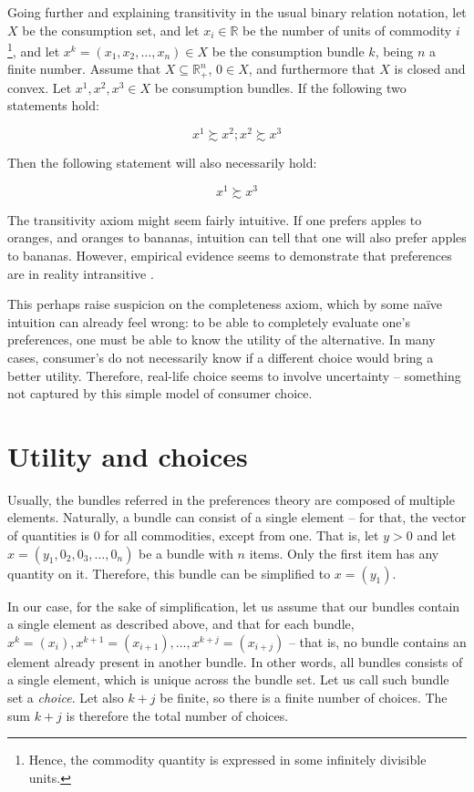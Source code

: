 \documentclass[12pt, letterpaper]{article}
\begin{document}
	Going further and explaining transitivity in the usual binary relation notation, let $X$ be the consumption set, and let $x_i \in \mathbb{R}$ be the number of units of commodity $i$\footnote{Hence, the commodity quantity is expressed in some infinitely divisible units.}, and let $x^k= (x_1, x_2, \dots, x_n) \in X$ be the consumption bundle $k$, being $n$ a finite number. Assume that $X \subseteq \mathbb{R}_+^n$, $0 \in X$, and furthermore that $X$ is closed and convex. Let $x^1, x^2, x^3 \in X$ be consumption bundles. If the following two statements hold:

	\begin{equation}
		x^1 \succsim x^2; x^2 \succsim x^3
	\end{equation}

	Then the following statement will also necessarily hold:

	\begin{equation}
		x^1 \succsim x^3
	\end{equation}

	The transitivity axiom might seem fairly intuitive. If one prefers apples to oranges, and oranges to bananas, intuition can tell that one will also prefer apples to bananas. However, empirical evidence seems to demonstrate that preferences are in reality intransitive \cite{GUADALUPELANAS2020e03459}. 
	
	This perhaps raise suspicion on the completeness axiom, which by some naïve intuition can already feel wrong: to be able to completely evaluate one's preferences, one must be able to know the utility of the alternative. In many cases, consumer's do not necessarily know if a different choice would bring a better utility. Therefore, real-life choice seems to involve uncertainty -- something not captured by this simple model of consumer choice.

	\section{Utility and choices}
	Usually, the bundles referred in the preferences theory are composed of multiple elements. Naturally, a bundle can consist of a single element -- for that, the vector of quantities is $0$ for all commodities, except from one. That is, let  $y > 0$ and let $x = (y_1, 0_{2}, 0_{3}, \dots, 0_n)$ be a bundle with $n$ items. Only the first item has any quantity on it. Therefore, this bundle can be simplified to $x = (y_1)$.  
		
	In our case, for the sake of simplification, let us assume that our bundles contain a single element as described above, and that for each bundle, $x^k = (x_i), x^{k+1}= (x_{i+1}), \dots , x^{k+j} = (x_{i+j})$ -- that is, no bundle contains an element already present in another bundle. In other words, all bundles consists of a single element, which is unique across the bundle set. Let us call such bundle set a \textit{choice}. Let also $k+j$ be finite, so there is a finite number of choices. The sum $k+j$ is therefore the total number of choices.
	
\end{document}
